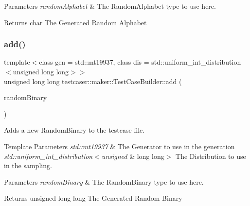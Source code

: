 \begin{DoxyParams}{Parameters}
{\em random\+Alphabet} & The Random\+Alphabet type to use here. \\
\hline
\end{DoxyParams}
\begin{DoxyReturn}{Returns}
char The Generated Random Alphabet 
\end{DoxyReturn}
\mbox{\label{classtestcaser_1_1maker_1_1TestCaseBuilder_ae00a78ee096f8e1b6a59469445a99b53}} 
\subsubsection{\texorpdfstring{add()}{add()}\hspace{0.1cm}{\footnotesize\ttfamily [2/11]}}
{\footnotesize\ttfamily template$<$class gen  = std\+::mt19937, class dis  = std\+::uniform\+\_\+int\+\_\+distribution$<$unsigned long long$>$$>$ \\
unsigned long long testcaser\+::maker\+::\+Test\+Case\+Builder\+::add (\begin{DoxyParamCaption}\item[{\mbox{\hyperlink{structtestcaser_1_1maker_1_1types_1_1RandomBinary}{types\+::\+Random\+Binary}}$<$ gen, dis $>$ \&}]{random\+Binary }\end{DoxyParamCaption})\hspace{0.3cm}{\ttfamily [inline]}}



Adds a new Random\+Binary to the testcase file. 


\begin{DoxyTemplParams}{Template Parameters}
{\em std\+::mt19937} & The Generator to use in the generation \\
\hline
{\em std\+::uniform\+\_\+int\+\_\+distribution$<$unsigned} & long long$>$ The Distribution to use in the sampling. \\
\hline
\end{DoxyTemplParams}

\begin{DoxyParams}{Parameters}
{\em random\+Binary} & The Random\+Binary type to use here. \\
\hline
\end{DoxyParams}
\begin{DoxyReturn}{Returns}
unsigned long long The Generated Random Binary 
\end{DoxyReturn}
\mbox{\label{classtestcaser_1_1maker_1_1TestCaseBuilder_a9c3e973820d032cce82ab0d070c700f9}} 
